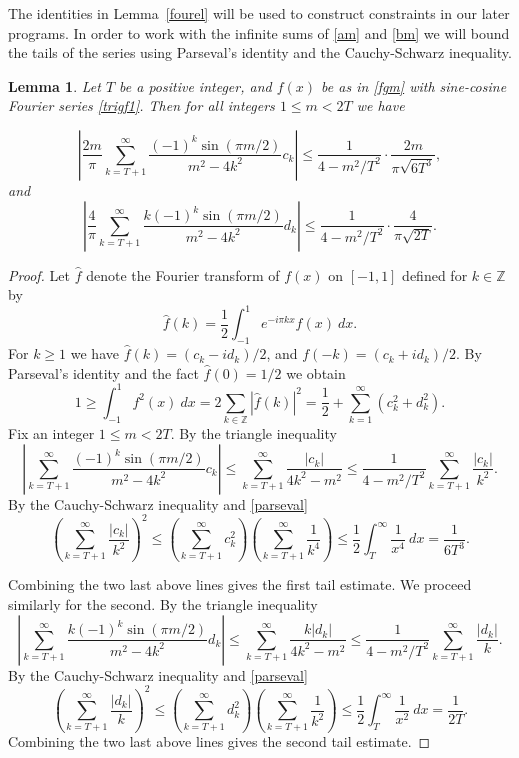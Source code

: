 \documentclass[12pt]{article}
\newtheorem{lemma}[theorem]{Lemma}
\numberwithin{equation}{section}
\begin{document}
The identities in Lemma~\ref{fourel} will be used to construct constraints in our later programs. In order to work with the infinite sums of \eqref{am} and \eqref{bm} we will bound the tails of the series using Parseval's identity and the Cauchy-Schwarz inequality. 




\begin{lemma}\label{tailbounds} Let $T$ be a positive integer, and $f(x)$ be as in \eqref{fgm} with sine-cosine Fourier series \eqref{trigf1}. Then for all integers $1 \leq m < 2T$ we have

\[ \left|\frac{2m}{\pi} \sum_{k=T+1}^\infty \frac{(-1)^k \sin(\pi m/2)}{m^2-4k^2} c_k\right| \leq \frac{1}{4-m^2/T^2} \cdot \frac{2m}{\pi \sqrt{6T^3}},\]
and
\[ \left|\frac{4}{\pi} \sum_{k=T+1}^\infty \frac{k(-1)^k \sin(\pi m/2)}{m^2-4k^2} d_k\right| \leq \frac{1}{4-m^2/T^2}\cdot \frac{4}{\pi\sqrt{2T}}.  \]



\end{lemma}



\begin{proof} Let $\hat{f}$ denote the Fourier transform of $f(x)$ on $[-1,1]$ defined for $k \in \mathbb{Z}$ by  
\[ \hat{f}(k) =\frac{1}{2} \int_{-1}^1 e^{-i\pi k x}f(x) \ dx.\]
For $k \geq 1$ we have $\hat{f}(k) = (c_k-id_k)/2$, and $f(-k) =(c_k+id_k)/2$. By Parseval's identity and the fact $\hat{f}(0) = 1/2$ we obtain 
\begin{equation}\label{parseval} 1 \geq \int_{-1}^1 f^2(x) \ dx = 2 \sum_{k \in \mathbb{Z}} |\hat{f}(k)|^2 = \frac{1}{2} + \sum_{k=1}^\infty (c_k^2+d_k^2).\end{equation}
Fix an integer $1 \leq m < 2T$. By the triangle inequality
\[ \left| \sum_{k=T+1}^\infty \frac{(-1)^k \sin(\pi m/2)}{m^2-4k^2} c_k\right|   \leq \sum_{k=T+1}^\infty \frac{|c_k|}{4k^2-m^2} \leq \frac{1}{4-m^2/T^2} \sum_{k=T+1}^\infty \frac{|c_k|}{k^2 } .\]
By the Cauchy-Schwarz inequality and \eqref{parseval}
\[ \left(\sum_{k=T+1}^\infty  \frac{|c_k|}{k^2 } \right)^2 \leq \left(\sum_{k=T+1}^\infty  c_k^2 \right)\left(\sum_{k=T+1}^\infty  \frac{1}{k^4 } \right) \leq \frac{1}{2}\int_T^\infty \frac{1}{x^4} \ dx = \frac{1}{6T^3}. \]

Combining the two last above lines gives the first tail estimate. We proceed similarly for the second. By the triangle inequality
\[ \left| \sum_{k=T+1}^\infty \frac{k(-1)^k \sin(\pi m/2)}{m^2-4k^2} d_k\right|   \leq \sum_{k=T+1}^\infty \frac{k|d_k|}{4k^2-m^2} \leq \frac{1}{4-m^2/T^2} \sum_{k=T+1}^\infty \frac{|d_k|}{k } .\]
By the Cauchy-Schwarz inequality and \eqref{parseval}
\[ \left(\sum_{k=T+1}^\infty  \frac{|d_k|}{k} \right)^2 \leq \left(\sum_{k=T+1}^\infty  d_k^2 \right)\left(\sum_{k=T+1}^\infty  \frac{1}{k^2 } \right) \leq \frac{1}{2}\int_T^\infty \frac{1}{x^2} \ dx = \frac{1}{2T}. \]
Combining the two last above lines gives the second tail estimate.

\end{proof}
\end{document}
